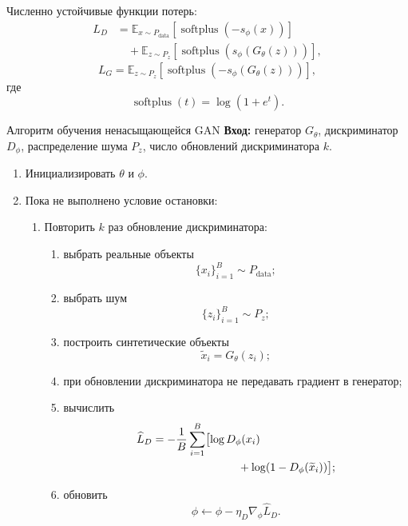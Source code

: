 \documentclass[12pt,a4paper]{article}
\newcommand{\E}{\mathbb{E}}
\numberwithin{equation}{section}
\theoremstyle{definition}
\theoremstyle{remark}
\begin{document}
Численно устойчивые функции потерь:
\[
\begin{split}
    L_D
    &=
    \E_{x\sim P_{\mathrm{data}}}
    [\operatorname{softplus}(-s_\phi(x))]\\
    &\quad+
    \E_{z\sim P_z}
    [\operatorname{softplus}(s_\phi(G_\theta(z)))],
\end{split}
\]
\[
    L_G
    =
    \E_{z\sim P_z}
    [\operatorname{softplus}(-s_\phi(G_\theta(z)))],
\]
где
\[
    \operatorname{softplus}(t)=\log(1+e^t).
\]

\begin{algobox}{Алгоритм обучения ненасыщающейся GAN}
\textbf{Вход:} генератор \(G_\theta\), дискриминатор \(D_\phi\),
распределение шума \(P_z\), число обновлений дискриминатора \(k\).

\begin{enumerate}
    \item Инициализировать \(\theta\) и \(\phi\).

    \item Пока не выполнено условие остановки:
    \begin{enumerate}
        \item Повторить \(k\) раз обновление дискриминатора:
        \begin{enumerate}
            \item выбрать реальные объекты
            \[
                \{x_i\}_{i=1}^{B}
                \sim P_{\mathrm{data}};
            \]
            \item выбрать шум
            \[
                \{z_i\}_{i=1}^{B}
                \sim P_z;
            \]
            \item построить синтетические объекты
            \[
                \widetilde{x}_i=G_\theta(z_i);
            \]
            \item при обновлении дискриминатора не передавать градиент
            в генератор;
            \item вычислить
            \[
            \begin{split}
                \widehat{L}_D
                &=
                -\frac{1}{B}\sum_{i=1}^{B}
                \bigl[
                    \log D_\phi(x_i)\\
                &\hspace{27mm}
                    +\log(1-D_\phi(\widetilde{x}_i))
                \bigr];
            \end{split}
            \]
            \item обновить
            \[
                \phi
                \leftarrow
                \phi-\eta_D\nabla_\phi\widehat{L}_D.
            \]
        \end{enumerate}


\end{enumerate}
\end{enumerate}
\end{algobox}
\end{document}
